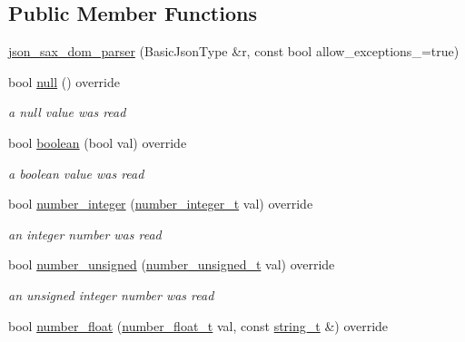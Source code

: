 \subsection*{Public Member Functions}
\begin{DoxyCompactItemize}
\item 
\mbox{\hyperlink{classnlohmann_1_1detail_1_1json__sax__dom__parser_afc50fee0a92ce84afb84041ebbdfba80}{json\+\_\+sax\+\_\+dom\+\_\+parser}} (Basic\+Json\+Type \&r, const bool allow\+\_\+exceptions\+\_\+=true)
\item 
bool \mbox{\hyperlink{classnlohmann_1_1detail_1_1json__sax__dom__parser_a0ec9faafc4b8d4052a6ed6d3b720d748}{null}} () override
\begin{DoxyCompactList}\small\item\em a null value was read \end{DoxyCompactList}\item 
bool \mbox{\hyperlink{classnlohmann_1_1detail_1_1json__sax__dom__parser_a8746e803df6c21cde68662bc707aba84}{boolean}} (bool val) override
\begin{DoxyCompactList}\small\item\em a boolean value was read \end{DoxyCompactList}\item 
bool \mbox{\hyperlink{classnlohmann_1_1detail_1_1json__sax__dom__parser_a835f34811b941c9d9d90b8960b50ed36}{number\+\_\+integer}} (\mbox{\hyperlink{structnlohmann_1_1json__sax_a0cef30121f02b7fee85e9708148ea0aa}{number\+\_\+integer\+\_\+t}} val) override
\begin{DoxyCompactList}\small\item\em an integer number was read \end{DoxyCompactList}\item 
bool \mbox{\hyperlink{classnlohmann_1_1detail_1_1json__sax__dom__parser_a5140b219d7e4c291ca24d7d736798062}{number\+\_\+unsigned}} (\mbox{\hyperlink{structnlohmann_1_1json__sax_a32028cc056ae0f43aaae331cdbbbf856}{number\+\_\+unsigned\+\_\+t}} val) override
\begin{DoxyCompactList}\small\item\em an unsigned integer number was read \end{DoxyCompactList}\item 
bool \mbox{\hyperlink{classnlohmann_1_1detail_1_1json__sax__dom__parser_a6c280f22710c94b7681d1a5488d06f39}{number\+\_\+float}} (\mbox{\hyperlink{structnlohmann_1_1json__sax_a390c209bffd8c4800c8f3076dc465a20}{number\+\_\+float\+\_\+t}} val, const \mbox{\hyperlink{structnlohmann_1_1json__sax_ae01977a9f3c5b3667b7a2929ed91061e}{string\+\_\+t}} \&) override

\end{DoxyCompactItemize}

